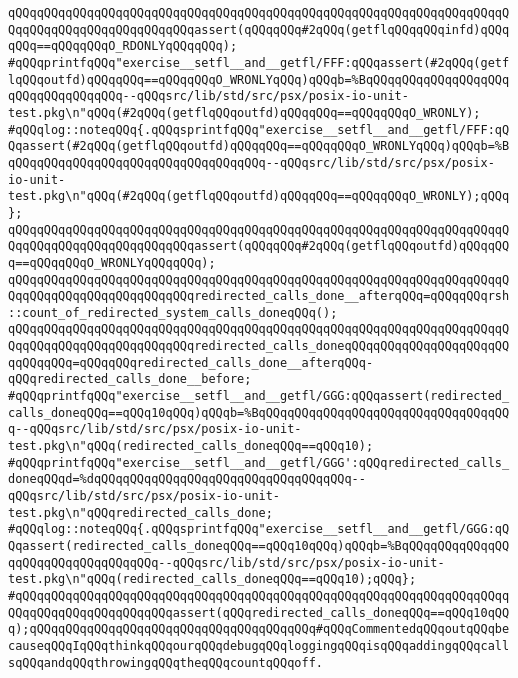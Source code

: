 \verb|qQQqqQQqqQQqqQQqqQQqqQQqqQQqqQQqqQQqqQQqqQQqqQQqqQQqqQQqqQQqqQQqqQQqqQQqqQQqqQQqqQQqqQQqqQQqqQQqassert(qQQqqQQq#2qQQq(getflqQQqqQQqinfd)qQQqqQQq==qQQqqQQqO_RDONLYqQQqqQQq);|\newline
\verb|#qQQqprintfqQQq"exercise__setfl__and__getfl/FFF:qQQqassert(#2qQQq(getflqQQqoutfd)qQQqqQQq==qQQqqQQqO_WRONLYqQQq)qQQqb=%BqQQqqQQqqQQqqQQqqQQqqQQqqQQqqQQqqQQq--qQQqsrc/lib/std/src/psx/posix-io-unit-test.pkg\n"qQQq(#2qQQq(getflqQQqoutfd)qQQqqQQq==qQQqqQQqO_WRONLY);|\newline
\verb|#qQQqlog::noteqQQq{.qQQqsprintfqQQq"exercise__setfl__and__getfl/FFF:qQQqassert(#2qQQq(getflqQQqoutfd)qQQqqQQq==qQQqqQQqO_WRONLYqQQq)qQQqb=%BqQQqqQQqqQQqqQQqqQQqqQQqqQQqqQQqqQQq--qQQqsrc/lib/std/src/psx/posix-io-unit-test.pkg\n"qQQq(#2qQQq(getflqQQqoutfd)qQQqqQQq==qQQqqQQqO_WRONLY);qQQq};|\newline
\verb|qQQqqQQqqQQqqQQqqQQqqQQqqQQqqQQqqQQqqQQqqQQqqQQqqQQqqQQqqQQqqQQqqQQqqQQqqQQqqQQqqQQqqQQqqQQqqQQqassert(qQQqqQQq#2qQQq(getflqQQqoutfd)qQQqqQQq==qQQqqQQqO_WRONLYqQQqqQQq);|\newline
\newline
\verb|qQQqqQQqqQQqqQQqqQQqqQQqqQQqqQQqqQQqqQQqqQQqqQQqqQQqqQQqqQQqqQQqqQQqqQQqqQQqqQQqqQQqqQQqqQQqqQQqredirected_calls_done__afterqQQq=qQQqqQQqrsh::count_of_redirected_system_calls_doneqQQq();|\newline
\verb|qQQqqQQqqQQqqQQqqQQqqQQqqQQqqQQqqQQqqQQqqQQqqQQqqQQqqQQqqQQqqQQqqQQqqQQqqQQqqQQqqQQqqQQqqQQqqQQqredirected_calls_doneqQQqqQQqqQQqqQQqqQQqqQQqqQQqqQQq=qQQqqQQqredirected_calls_done__afterqQQq-qQQqredirected_calls_done__before;|\newline
\newline
\verb|#qQQqprintfqQQq"exercise__setfl__and__getfl/GGG:qQQqassert(redirected_calls_doneqQQq==qQQq10qQQq)qQQqb=%BqQQqqQQqqQQqqQQqqQQqqQQqqQQqqQQqqQQq--qQQqsrc/lib/std/src/psx/posix-io-unit-test.pkg\n"qQQq(redirected_calls_doneqQQq==qQQq10);|\newline
\verb|#qQQqprintfqQQq"exercise__setfl__and__getfl/GGG':qQQqredirected_calls_doneqQQqd=%dqQQqqQQqqQQqqQQqqQQqqQQqqQQqqQQqqQQq--qQQqsrc/lib/std/src/psx/posix-io-unit-test.pkg\n"qQQqredirected_calls_done;|\newline
\verb|#qQQqlog::noteqQQq{.qQQqsprintfqQQq"exercise__setfl__and__getfl/GGG:qQQqassert(redirected_calls_doneqQQq==qQQq10qQQq)qQQqb=%BqQQqqQQqqQQqqQQqqQQqqQQqqQQqqQQqqQQq--qQQqsrc/lib/std/src/psx/posix-io-unit-test.pkg\n"qQQq(redirected_calls_doneqQQq==qQQq10);qQQq};|\newline
\verb|#qQQqqQQqqQQqqQQqqQQqqQQqqQQqqQQqqQQqqQQqqQQqqQQqqQQqqQQqqQQqqQQqqQQqqQQqqQQqqQQqqQQqqQQqqQQqassert(qQQqredirected_calls_doneqQQq==qQQq10qQQq);qQQqqQQqqQQqqQQqqQQqqQQqqQQqqQQqqQQqqQQq#qQQqCommentedqQQqoutqQQqbecauseqQQqIqQQqthinkqQQqourqQQqdebugqQQqloggingqQQqisqQQqaddingqQQqcallsqQQqandqQQqthrowingqQQqtheqQQqcountqQQqoff.|\newline
